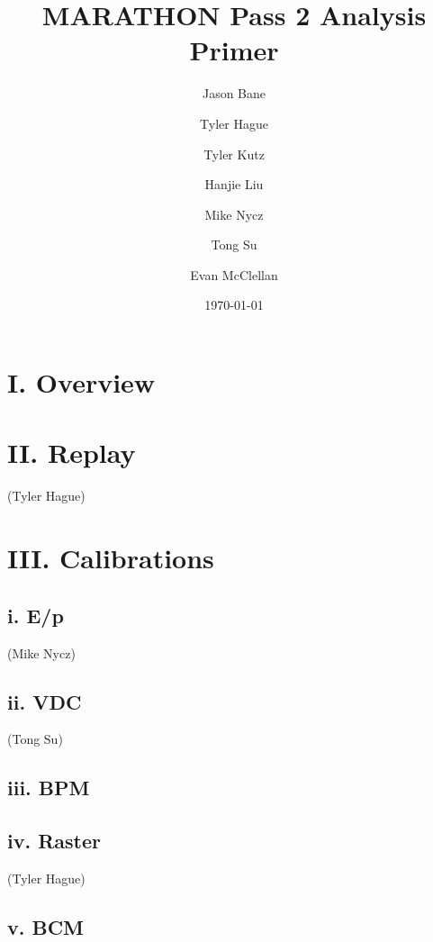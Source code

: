 \documentclass[letterpaper,aps,prl,superscriptaddress,floatfix,twocolumn]{revtex4}
\begin{document}
\title{MARATHON Pass 2 Analysis Primer}

\author{Jason Bane}
\author{Tyler Hague}
\author{Tyler Kutz}
\author{Hanjie Liu}
\author{Mike Nycz}
\author{Tong Su}

\author{Evan McClellan}


\date{\today}

\begin{abstract}
\end{abstract}

\maketitle

\section{I. Overview}

\section{II. Replay}
 (Tyler Hague)

\section{III. Calibrations}

 \subsection{i. E/p}
 (Mike Nycz)

 \subsection{ii. VDC}
(Tong Su)
%

 \subsection{iii. BPM}


 \subsection{iv. Raster}
 (Tyler Hague)
 


 \subsection{v. BCM}

\end{document}
